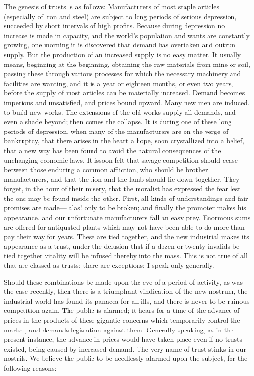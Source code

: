 \documentclass[11pt,openany]{book}
\begin{document}
The genesis of trusts is as follows: Manufacturers of most staple articles (especially of iron and steel) are subject to long periods of serious depression, succeeded by short intervals of high profits. Because during depression no increase is made in capacity, and the world's population and wants are constantly growing, one morning it is discovered that demand has overtaken and outrun supply. But the production of an increased supply is no easy matter. It usually means, beginning at the beginning, obtaining the raw materials from mine or soil, passing these through various processes for which the necessary machinery and facilities are wanting, and it is a year or eighteen months, or even two years, before the supply of most articles can be materially increased. Demand becomes imperious and unsatisfied, and prices bound upward. Many new men are induced. to build new works. The extensions of the old works supply all demands, and even a shade beyond; then comes the collapse. It is during one of these long periods of depression, when many of the manufacturers are on the verge of bankruptcy, that there arises in the heart a hope, soon crystallized into a belief, that a new way has been found to avoid the natural consequences of the unchanging economic laws. It issoon felt that savage competition should cease between those enduring a common affliction, who should be brother manufacturers, and that the lion and the lamb should lie down together. They forget, in the hour of their misery, that the moralist has expressed the fear lest the one may be found inside the other. First, all kinds of understandings and fair promises are made--- alas! only to be broken; and finally the promoter makes his appearance, and our unfortunate manufacturers fall an easy prey. Enormous sums are offered for antiquated plants which may not have been able to do more than pay their way for years. These are tied together, and the new industrial makes its appearance as a trust, under the delusion that if a dozen or twenty invalids be tied together vitality will be infused thereby into the mass. This is not true of all that are classed as trusts; there are exceptions; I speak only generally.

Should these combinations be made upon the eve of a period of activity, as was the case recently, then there is a triumphant vindication of the new nostrum, the industrial world has found its panacea for all ills, and there is never to be ruinous competition again. The public is alarmed; it hears for a time of the advance of prices in the products of these gigantic concerns which temporarily control the market, and demands legislation against them. Generally speaking, as in the present instance, the advance in prices would have taken place even if no trusts existed, being caused by increased demand. The very name of trust stinks in our nostrils. We believe the public to be needlessly alarmed upon the subject, for the following reasons:
\end{document}
